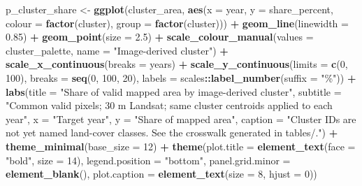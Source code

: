 \documentclass[
]{article}
\newenvironment{Shaded}{\begin{snugshade}}{\end{snugshade}}
\newcommand{\AttributeTok}[1]{\textcolor[rgb]{0.13,0.29,0.53}{#1}}
\newcommand{\DecValTok}[1]{\textcolor[rgb]{0.00,0.00,0.81}{#1}}
\newcommand{\FloatTok}[1]{\textcolor[rgb]{0.00,0.00,0.81}{#1}}
\newcommand{\FunctionTok}[1]{\textcolor[rgb]{0.13,0.29,0.53}{\textbf{#1}}}
\newcommand{\NormalTok}[1]{#1}
\newcommand{\OtherTok}[1]{\textcolor[rgb]{0.56,0.35,0.01}{#1}}
\newcommand{\SpecialCharTok}[1]{\textcolor[rgb]{0.81,0.36,0.00}{\textbf{#1}}}
\newcommand{\StringTok}[1]{\textcolor[rgb]{0.31,0.60,0.02}{#1}}
\begin{document}
\begin{Shaded}
\begin{Highlighting}[]
\NormalTok{p\_cluster\_share }\OtherTok{\textless{}{-}} \FunctionTok{ggplot}\NormalTok{(cluster\_area, }\FunctionTok{aes}\NormalTok{(}\AttributeTok{x =}\NormalTok{ year, }\AttributeTok{y =}\NormalTok{ share\_percent, }\AttributeTok{colour =} \FunctionTok{factor}\NormalTok{(cluster), }\AttributeTok{group =} \FunctionTok{factor}\NormalTok{(cluster))) }\SpecialCharTok{+}
  \FunctionTok{geom\_line}\NormalTok{(}\AttributeTok{linewidth =} \FloatTok{0.85}\NormalTok{) }\SpecialCharTok{+} \FunctionTok{geom\_point}\NormalTok{(}\AttributeTok{size =} \FloatTok{2.5}\NormalTok{) }\SpecialCharTok{+}
  \FunctionTok{scale\_colour\_manual}\NormalTok{(}\AttributeTok{values =}\NormalTok{ cluster\_palette, }\AttributeTok{name =} \StringTok{"Image{-}derived cluster"}\NormalTok{) }\SpecialCharTok{+}
  \FunctionTok{scale\_x\_continuous}\NormalTok{(}\AttributeTok{breaks =}\NormalTok{ years) }\SpecialCharTok{+}
  \FunctionTok{scale\_y\_continuous}\NormalTok{(}\AttributeTok{limits =} \FunctionTok{c}\NormalTok{(}\DecValTok{0}\NormalTok{, }\DecValTok{100}\NormalTok{), }\AttributeTok{breaks =} \FunctionTok{seq}\NormalTok{(}\DecValTok{0}\NormalTok{, }\DecValTok{100}\NormalTok{, }\DecValTok{20}\NormalTok{), }\AttributeTok{labels =}\NormalTok{ scales}\SpecialCharTok{::}\FunctionTok{label\_number}\NormalTok{(}\AttributeTok{suffix =} \StringTok{"\%"}\NormalTok{)) }\SpecialCharTok{+}
  \FunctionTok{labs}\NormalTok{(}\AttributeTok{title =} \StringTok{"Share of valid mapped area by image{-}derived cluster"}\NormalTok{,}
       \AttributeTok{subtitle =} \StringTok{"Common valid pixels; 30 m Landsat; same cluster centroids applied to each year"}\NormalTok{,}
       \AttributeTok{x =} \StringTok{"Target year"}\NormalTok{, }\AttributeTok{y =} \StringTok{"Share of mapped area"}\NormalTok{,}
       \AttributeTok{caption =} \StringTok{"Cluster IDs are not yet named land{-}cover classes. See the crosswalk generated in tables/."}\NormalTok{) }\SpecialCharTok{+}
  \FunctionTok{theme\_minimal}\NormalTok{(}\AttributeTok{base\_size =} \DecValTok{12}\NormalTok{) }\SpecialCharTok{+}
  \FunctionTok{theme}\NormalTok{(}\AttributeTok{plot.title =} \FunctionTok{element\_text}\NormalTok{(}\AttributeTok{face =} \StringTok{"bold"}\NormalTok{, }\AttributeTok{size =} \DecValTok{14}\NormalTok{), }\AttributeTok{legend.position =} \StringTok{"bottom"}\NormalTok{,}
        \AttributeTok{panel.grid.minor =} \FunctionTok{element\_blank}\NormalTok{(), }\AttributeTok{plot.caption =} \FunctionTok{element\_text}\NormalTok{(}\AttributeTok{size =} \DecValTok{8}\NormalTok{, }\AttributeTok{hjust =} \DecValTok{0}\NormalTok{))}

\end{Highlighting}
\end{Shaded}
\end{document}
